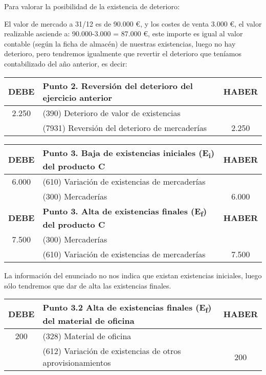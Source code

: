 \documentclass{article}
\begin{document}

Para valorar la posibilidad de la existencia de deterioro:

El valor de mercado a 31/12 es de 90.000 €, y los costes de venta 3.000 €, el valor realizable asciende a: 90.000-3.000 = 87.000 €, este importe es igual al valor contable (según la ficha de almacén) de nuestras existencias, luego no hay deterioro, pero tendremos igualmente que revertir el deterioro que teníamos contabilizado del año anterior, es decir:

\begin{table}[H]
\centering
\begin{tabular}{|c|l|c|}
\hline
\textbf{DEBE} & \textbf{Punto 2. Reversión del deterioro del ejercicio anterior} & \textbf{HABER} \\
\hline
2.250 & (390) Deterioro de valor de existencias & \\
 & (7931) Reversión del deterioro de mercaderías & 2.250 \\
\hline
\end{tabular}
\end{table}

\begin{table}[H]
\centering
\begin{tabular}{|c|l|c|}
\hline
\textbf{DEBE} & \textbf{Punto 3. Baja de existencias iniciales (E\textsubscript{i}) del producto C} & \textbf{HABER} \\
\hline
6.000 & (610) Variación de existencias de mercaderías & \\
 & (300) Mercaderías & 6.000 \\
\hline
\textbf{DEBE} & \textbf{Punto 3. Alta de existencias finales (E\textsubscript{f}) del producto C} & \textbf{HABER} \\
\hline
7.500 & (300) Mercaderías & \\
 & (610) Variación de existencias de mercaderías & 7.500 \\
\hline
\end{tabular}
\end{table}

La información del enunciado no nos indica que existan existencias iniciales, luego sólo tendremos que dar de alta las existencias finales.

\begin{table}[H]
\centering
\begin{tabular}{|c|l|c|}
\hline
\textbf{DEBE} & \textbf{Punto 3.2 Alta de existencias finales (E\textsubscript{f}) del material de oficina} & \textbf{HABER} \\
\hline
200 & (328) Material de oficina & \\
 & (612) Variación de existencias de otros aprovisionamientos & 200 \\
\hline
\end{tabular}
\end{table}
\end{document}
